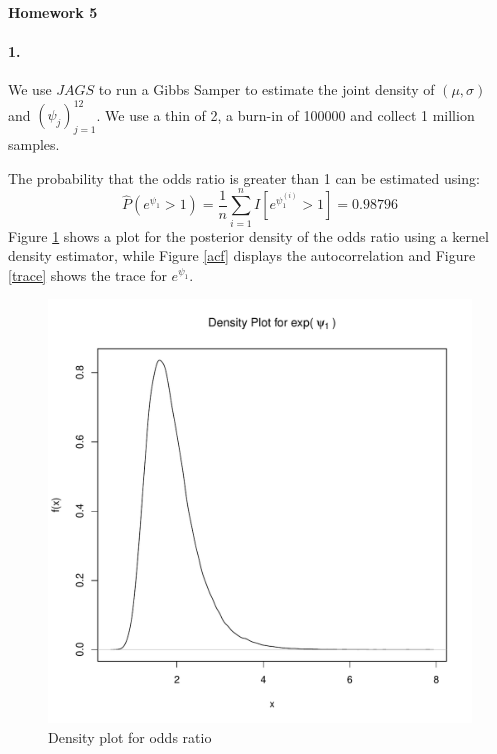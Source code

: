 \documentclass[12pt, leqno]{article}
\begin{document}
\pagestyle{fancy}

\begin{center}
{\large {\bf Homework 5}} \\
\end{center}
\paragraph{1.} We use $JAGS$ to run a Gibbs Samper to estimate the
joint density of $(\mu,\sigma)$ and $(\psi_j)_{j=1}^{12}$. We use a thin of
2, a burn-in of 100000 and collect 1 million samples. 

The probability that the odds ratio is greater than 1
can be estimated using:
\[
\hat{P}(e^{{\psi}_1} >1) = \frac{1}{n}{\sum_{i=1}^n
  I{[e^{\psi^{(i)}_1}>1]}} =  0.98796
\]
Figure \ref{density} shows a plot for the posterior density of the
odds ratio using a kernel density estimator, while Figure \ref{acf}
displays the autocorrelation and Figure \ref{trace} shows the trace for
$e^{{\psi}_1}$.

\begin{figure}
\begin{center}
  \includegraphics[scale=0.55]{psi1density.pdf}
\end{center}
\caption{Density plot for odds ratio} 
\label{density}
\end{figure} 
\end{document}
